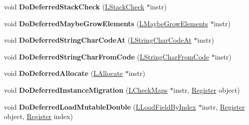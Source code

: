 \begin{DoxyCompactItemize}
\item 
void {\bfseries Do\+Deferred\+Stack\+Check} (\hyperlink{classv8_1_1internal_1_1_l_stack_check}{L\+Stack\+Check} $\ast$instr)\hypertarget{classv8_1_1internal_1_1_l_code_gen_a273730f2504ea249d9deb8dde7b314ee}{}\label{classv8_1_1internal_1_1_l_code_gen_a273730f2504ea249d9deb8dde7b314ee}

\item 
void {\bfseries Do\+Deferred\+Maybe\+Grow\+Elements} (\hyperlink{classv8_1_1internal_1_1_l_maybe_grow_elements}{L\+Maybe\+Grow\+Elements} $\ast$instr)\hypertarget{classv8_1_1internal_1_1_l_code_gen_afe319c35fc8adaff35f3417fb7c833d6}{}\label{classv8_1_1internal_1_1_l_code_gen_afe319c35fc8adaff35f3417fb7c833d6}

\item 
void {\bfseries Do\+Deferred\+String\+Char\+Code\+At} (\hyperlink{classv8_1_1internal_1_1_l_string_char_code_at}{L\+String\+Char\+Code\+At} $\ast$instr)\hypertarget{classv8_1_1internal_1_1_l_code_gen_a6b229168338a73ef11c203f845b68cb4}{}\label{classv8_1_1internal_1_1_l_code_gen_a6b229168338a73ef11c203f845b68cb4}

\item 
void {\bfseries Do\+Deferred\+String\+Char\+From\+Code} (\hyperlink{classv8_1_1internal_1_1_l_string_char_from_code}{L\+String\+Char\+From\+Code} $\ast$instr)\hypertarget{classv8_1_1internal_1_1_l_code_gen_acf78c92290237e368a4b178f049afbc6}{}\label{classv8_1_1internal_1_1_l_code_gen_acf78c92290237e368a4b178f049afbc6}

\item 
void {\bfseries Do\+Deferred\+Allocate} (\hyperlink{classv8_1_1internal_1_1_l_allocate}{L\+Allocate} $\ast$instr)\hypertarget{classv8_1_1internal_1_1_l_code_gen_a5a708933d9b086e295c8bf902f66033e}{}\label{classv8_1_1internal_1_1_l_code_gen_a5a708933d9b086e295c8bf902f66033e}

\item 
void {\bfseries Do\+Deferred\+Instance\+Migration} (\hyperlink{classv8_1_1internal_1_1_l_check_maps}{L\+Check\+Maps} $\ast$instr, \hyperlink{structv8_1_1internal_1_1_register}{Register} object)\hypertarget{classv8_1_1internal_1_1_l_code_gen_a9a11a557dc4a35165efe7432b91cce0c}{}\label{classv8_1_1internal_1_1_l_code_gen_a9a11a557dc4a35165efe7432b91cce0c}

\item 
void {\bfseries Do\+Deferred\+Load\+Mutable\+Double} (\hyperlink{classv8_1_1internal_1_1_l_load_field_by_index}{L\+Load\+Field\+By\+Index} $\ast$instr, \hyperlink{structv8_1_1internal_1_1_register}{Register} object, \hyperlink{structv8_1_1internal_1_1_register}{Register} index)\hypertarget{classv8_1_1internal_1_1_l_code_gen_a61dd35347ffceb77063e647c486f62d4}{}\label{classv8_1_1internal_1_1_l_code_gen_a61dd35347ffceb77063e647c486f62d4}


\end{DoxyCompactItemize}
